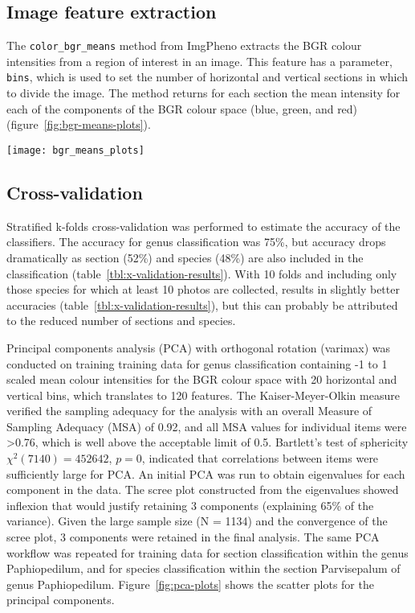 \documentclass[3p,twocolumn,10pt]{elsarticle}
\begin{document}
\subsection{Image feature extraction}

The \verb/color_bgr_means/ method from ImgPheno extracts the BGR colour intensities from a region of interest in an image. This feature has a parameter, \verb/bins/, which is used to set the number of horizontal and vertical sections in which to divide the image. The method returns for each section the mean intensity for each of the components of the BGR colour space (blue, green, and red) (figure~\ref{fig:bgr-means-plots}).

\begin{figure*}[t]
    \centering
    \texttt{[image: bgr\_means\_plots]}
    \caption{Plots of the mean BGR colour intensities for an image of \textit{P. druryi}. The plots display the mean intensities for the horizontal and vertical bins respectively.}
    \label{fig:bgr-means-plots}
\end{figure*}

\subsection{Cross-validation}

Stratified k-folds cross-validation was performed to estimate the accuracy of the classifiers. The accuracy for genus classification was 75\%, but accuracy drops dramatically as section (52\%) and species (48\%) are also included in the classification (table~\ref{tbl:x-validation-results}). With 10 folds and including only those species for which at least 10 photos are collected, results in slightly better accuracies (table~\ref{tbl:x-validation-results}), but this can probably be attributed to the reduced number of sections and species.

Principal components analysis (PCA) with orthogonal rotation (varimax) was conducted on training training data for genus classification containing -1 to 1 scaled mean colour intensities for the BGR colour space with 20 horizontal and vertical bins, which translates to 120 features. The Kaiser-Meyer-Olkin measure verified the sampling adequacy for the analysis with an overall Measure of Sampling Adequacy (MSA) of 0.92, and all MSA values for individual items were >0.76, which is well above the acceptable limit of 0.5. Bartlett's test of sphericity $\chi^2 (7140) = 452642$, $p = 0$, indicated that correlations between items were sufficiently large for PCA. An initial PCA was run to obtain eigenvalues for each component in the data. The scree plot constructed from the eigenvalues showed inflexion that would justify retaining 3 components (explaining 65\% of the variance). Given the large sample size (N = 1134) and the convergence of the scree plot, 3 components were retained in the final analysis. The same PCA workflow was repeated for training data for section classification within the genus Paphiopedilum, and for species classification within the section Parvisepalum of genus Paphiopedilum. Figure~\ref{fig:pca-plots} shows the scatter plots for the principal components.
\end{document}
